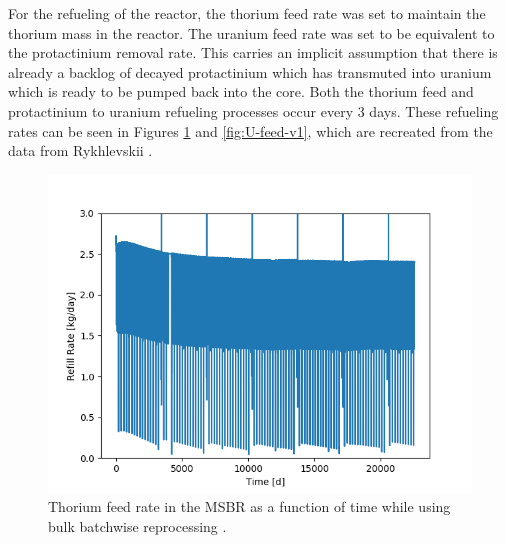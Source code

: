 For the refueling of the reactor, the thorium feed rate was set to maintain the thorium mass in the reactor. The uranium feed rate was set to be equivalent to the protactinium removal rate. This carries an implicit assumption that there is already a backlog of decayed protactinium which has transmuted into uranium which is ready to be pumped back into the core. Both the thorium feed and protactinium to uranium refueling processes occur every 3 days. These refueling rates can be seen in Figures \ref{fig:Th-feed-v1} and \ref{fig:U-feed-v1}, which are recreated from the data from Rykhlevskii \cite{rykhlevskii_advanced_2018}.


\begin{figure}[H]
  \centering
  \includegraphics[scale=0.7]{images/Th232rem_massv01.png}
  \caption{Thorium feed rate in the MSBR as a function of time while using bulk batchwise reprocessing \cite{rykhlevskii_advanced_2018}.}
   \label{fig:Th-feed-v1}
\end{figure}

